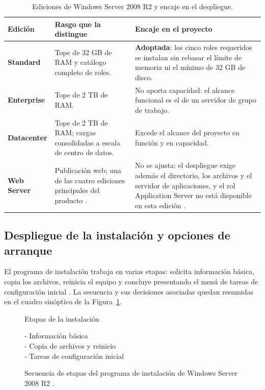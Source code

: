 \documentclass[12pt]{article}
\begin{document}
\begin{table}[htbp]
\centering
\small
\renewcommand{\arraystretch}{1.15}
\renewcommand{\tabularxcolumn}[1]{m{#1}}
\setlength{\emergencystretch}{1.5em}
\caption{Ediciones de Windows Server 2008 R2 y encaje en el despliegue.}
\label{tab:edicionesWindowsServer}
\begin{tabularx}{\textwidth}{>{\centering\arraybackslash}m{3.0cm} X X}
\toprule
\textbf{Edición} & \textbf{Rasgo que la distingue} & \textbf{Encaje en el proyecto} \\
\midrule
\textbf{Standard} & Tope de 32 GB de RAM y catálogo completo de roles. & \textbf{Adoptada}: los cinco roles requeridos se instalan sin rebasar el límite de memoria ni el mínimo de 32 GB de disco. \\
\addlinespace
\textbf{Enterprise} & Tope de 2 TB de RAM. & No aporta capacidad: el alcance funcional es el de un servidor de grupo de trabajo. \\
\addlinespace
\textbf{Datacenter} & Tope de 2 TB de RAM; cargas consolidadas a escala de centro de datos. & Excede el alcance del proyecto en función y en capacidad. \\
\addlinespace
\textbf{Web Server} & Publicación web; una de las cuatro ediciones principales del producto \parencite{microsoftInstallWinServer2008}. & No se ajusta: el despliegue exige además el directorio, los archivos y el servidor de aplicaciones, y el rol Application Server no está disponible en esta edición \parencite{microsoftApplicationServerRole}. \\
\bottomrule
\end{tabularx}
\end{table}

\subsection{Despliegue de la instalación y opciones de arranque}
\label{sec:opcionesInstalacion}

El programa de instalación trabaja en varias etapas: solicita información básica, copia los archivos, reinicia el equipo y concluye presentando el menú de tareas de configuración inicial \parencite{microsoftInstallWs2008r2}. La secuencia y sus decisiones asociadas quedan resumidas en el cuadro sinóptico de la Figura~\ref{fig:etapasInstalacion}.

\begin{figure}[htbp]
\centering
\begin{minipage}{0.9\textwidth}
\begin{localsubgroup}
Etapas de la instalación
\begin{localsubgroup}
- Información básica \\
- Copia de archivos y reinicio \\
- Tareas de configuración inicial
\end{localsubgroup}
\end{localsubgroup}
\end{minipage}
\caption{Secuencia de etapas del programa de instalación de Windows Server 2008 R2 \parencite{microsoftInstallWs2008r2}.}
\label{fig:etapasInstalacion}
\end{figure}
\end{document}

